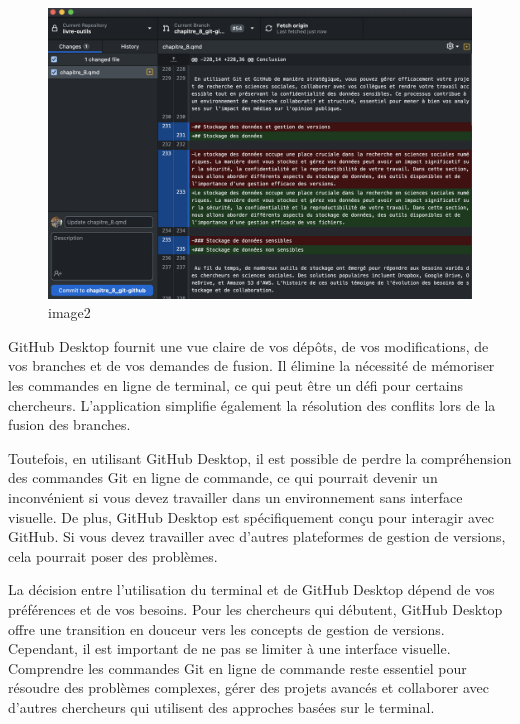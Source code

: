 \documentclass[
  letterpaper,
]{scrbook}
\begin{document}
\begin{figure}

{\centering \includegraphics{images/chapitre8_1.png}

}

\caption{image2}

\end{figure}

GitHub Desktop fournit une vue claire de vos dépôts, de vos
modifications, de vos branches et de vos demandes de fusion. Il élimine
la nécessité de mémoriser les commandes en ligne de terminal, ce qui
peut être un défi pour certains chercheurs. L'application simplifie
également la résolution des conflits lors de la fusion des branches.

Toutefois, en utilisant GitHub Desktop, il est possible de perdre la
compréhension des commandes Git en ligne de commande, ce qui pourrait
devenir un inconvénient si vous devez travailler dans un environnement
sans interface visuelle. De plus, GitHub Desktop est spécifiquement
conçu pour interagir avec GitHub. Si vous devez travailler avec d'autres
plateformes de gestion de versions, cela pourrait poser des problèmes.

La décision entre l'utilisation du terminal et de GitHub Desktop dépend
de vos préférences et de vos besoins. Pour les chercheurs qui débutent,
GitHub Desktop offre une transition en douceur vers les concepts de
gestion de versions. Cependant, il est important de ne pas se limiter à
une interface visuelle. Comprendre les commandes Git en ligne de
commande reste essentiel pour résoudre des problèmes complexes, gérer
des projets avancés et collaborer avec d'autres chercheurs qui utilisent
des approches basées sur le terminal.
\end{document}
